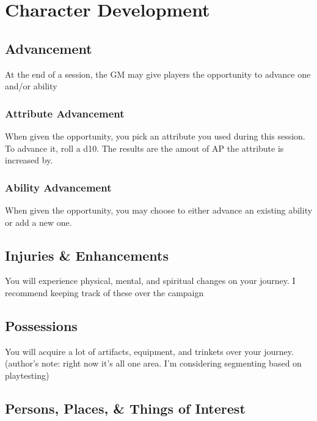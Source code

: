 \chapter{Character Development}

\section{Advancement}

At the end of a session, the GM may give players the opportunity to
advance one \attribute and/or ability

\subsection{Attribute Advancement}

When given the opportunity, you pick an attribute you used during
this session. To advance it, roll a d10.
The results are the amout of AP the attribute is increased by.

\subsection{Ability Advancement}

When given the opportunity, you may choose to either advance an existing
ability or add a new one.

\section{Injuries \& Enhancements}

You will experience physical, mental, and spiritual changes on your
journey. I recommend keeping track of these over the campaign

\section{Possessions}

You will acquire a lot of artifacts, equipment, and trinkets over
your journey. (author's note: right now it's all one area. I'm considering
segmenting based on playtesting)

\section{Persons, Places, \& Things of Interest}
